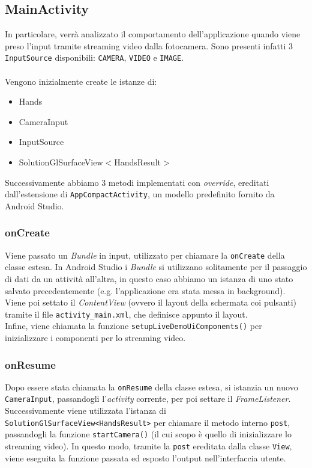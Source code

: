 \subsection{MainActivity}
In particolare, verrà analizzato il comportamento dell'applicazione quando viene preso l'input tramite streaming video dalla fotocamera. Sono presenti infatti 3 \texttt{InputSource} disponibili: \texttt{CAMERA}, \texttt{VIDEO} e \texttt{IMAGE}.\\
\\
\noindent Vengono inizialmente create le istanze di:
\begin{itemize}
    \item Hands
    \item CameraInput
    \item InputSource
    \item SolutionGlSurfaceView$<$HandsResult$>$ 
\end{itemize}

\noindent Successivamente abbiamo 3 metodi implementati con \textit{override}, ereditati dall'estensione di \texttt{AppCompactActivity}, un modello predefinito fornito da Android Studio.
\subsubsection{onCreate}
Viene passato un \textit{Bundle} in input, utilizzato per chiamare la \texttt{onCreate} della classe estesa. In Android Studio i \textit{Bundle} si utilizzano solitamente per il passaggio di dati da un attività all'altra, in questo caso abbiamo un istanza di uno stato salvato precedentemente (e.g. l'applicazione era stata messa in background).\\
Viene poi settato il \textit{ContentView} (ovvero il layout della schermata coi pulsanti) tramite il file \texttt{activity\_main.xml}, che definisce appunto il layout.\\
Infine, viene chiamata la funzione \texttt{setupLiveDemoUiComponents()} per inizializzare i componenti per lo streaming video.


\subsubsection{onResume}
Dopo essere stata chiamata la \texttt{onResume} della classe estesa, si istanzia un nuovo \texttt{CameraInput}, passandogli l'\textit{activity} corrente, per poi settare il \textit{FrameListener}.\\
Successivamente viene utilizzata l'istanza di \texttt{SolutionGlSurfaceView<HandsResult>} per chiamare il metodo interno \texttt{post}, passandogli la funzione \texttt{startCamera()} (il cui scopo è quello di inizializzare lo streaming video). In questo modo, tramite la \texttt{post} ereditata dalla classe \texttt{View}, viene eseguita la funzione passata ed esposto l'output nell'interfaccia utente.


